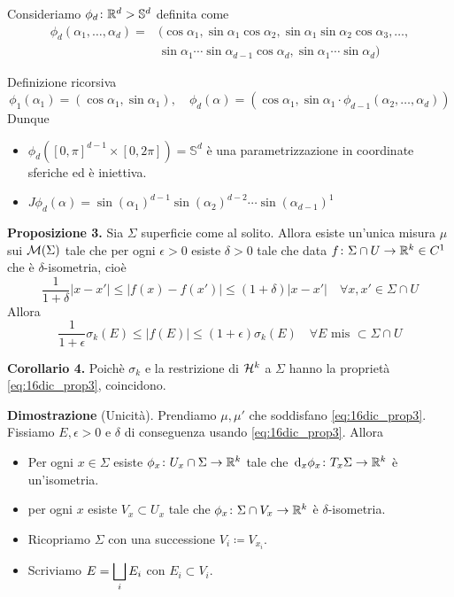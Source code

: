 Consideriamo $\phi_d \colon \mathbb R^d > \mathbb{S}^d$ definita come 
%
\begin{align*}
	\phi_d(\alpha_1,\ldots,\alpha_d) = & ( \cos \alpha_1, \sin \alpha_1 \cos \alpha_2, \sin \alpha_1 \sin \alpha_2 \cos \alpha_3,\ldots, \\
	& \sin \alpha_1 \cdots \sin \alpha_{d-1} \cos \alpha_d, \sin \alpha_1 \cdots \sin \alpha_d ) 
\end{align*}

Definizione ricorsiva
%
$$
\phi_1 (\alpha_1) = (\cos \alpha_1, \sin \alpha_1), \quad 
\phi_d(\alpha) = (\cos \alpha_1, \sin \alpha_1 \cdot \phi_{d-1}(\alpha_2,\ldots,\alpha_d))
$$
%
Dunque 
\begin{itemize}

	\item $\phi_d \left( [0,\pi]^{d-1} \times [0,2\pi] \right) = \mathbb{S}^d$ è una parametrizzazione in coordinate sferiche ed è iniettiva.

	\item $J\phi_d(\alpha) = \sin(\alpha_1)^{d-1} \sin(\alpha_2)^{d-2} \cdots \sin(\alpha_{d-1})^1$

\end{itemize}


\textbf{Proposizione 3.} Sia $\Sigma$ superficie come al solito. Allora esiste un'unica misura $\mu$ sui $\mathcal{M}(\Sigma)$ tale che per ogni $\epsilon > 0$ esiste $\delta > 0$ tale che data $f \colon \Sigma \cap U \to \mathbb R^k \in C^1$ che è $\delta$-isometria, cioè
%
\begin{equation}
	\label{eq:16dic_prop3} \tag{P}
	\frac{1}{1 + \delta} |x-x'| \leq |f(x) - f(x')| \leq (1+\delta)|x-x'| \quad \forall x,x' \in \Sigma \cap U
\end{equation}
Allora
%
$$
	\frac{1}{1+\epsilon} \sigma_k(E) \leq |f(E)| \leq (1+\epsilon)\sigma_k(E) \quad \forall E \text{ mis } \subset \Sigma \cap U
$$
%

\textbf{Corollario 4.} Poichè $\sigma_k$ e la restrizione di $\mathcal{H}^k$ a $\Sigma$ hanno la proprietà \eqref{eq:16dic_prop3}, coincidono.

\textbf{Dimostrazione} (Unicità). 
Prendiamo $\mu,\mu'$ che soddisfano \eqref{eq:16dic_prop3}.
Fissiamo $E,\epsilon > 0$ e $\delta$ di conseguenza usando \eqref{eq:16dic_prop3}. Allora
\begin{itemize}

	\item Per ogni $x \in \Sigma$ esiste $\phi_x \colon U_x \cap \Sigma \to \mathbb R^k$ tale che $\,\mathrm{d}_x \phi_x \colon T_x \Sigma \to \mathbb R^k$ è un'isometria.


	\item per ogni $x$ esiste $V_x \subset U_x$ tale che $\phi_x \colon \Sigma \cap V_x \to \mathbb R^k$ è $\delta$-isometria.


	\item Ricopriamo $\Sigma$ con una successione $V_i \coloneqq V_{x_i}$.


	\item Scriviamo $\displaystyle E = \bigsqcup_i E_i$ con $E_i \subset V_i$.

\end{itemize}
 
